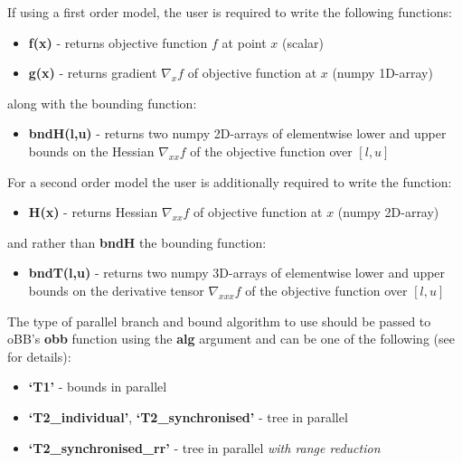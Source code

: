\documentclass[letterpaper,11pt,openany,oneside]{sphinxmanual}
\begin{document}
If using a first order model, the user is required to write the following functions:
\begin{itemize}
\item {} 
\textbf{f(x)} - returns objective function \(f\) at point \(x\) (scalar)

\item {} 
\textbf{g(x)} - returns gradient \(\nabla_x f\) of objective function at \(x\) (numpy 1D-array)

\end{itemize}

along with the bounding function:
\begin{itemize}
\item {} 
\textbf{bndH(l,u)} - returns two numpy 2D-arrays of elementwise lower and upper bounds on the Hessian \(\nabla_{xx} f\) of the objective function over \([l,u]\)

\end{itemize}

For a second order model the user is additionally required to write the function:
\begin{itemize}
\item {} 
\textbf{H(x)} - returns Hessian \(\nabla_{xx} f\) of objective function at \(x\) (numpy 2D-array)

\end{itemize}

and rather than \textbf{bndH} the bounding function:
\begin{itemize}
\item {} 
\textbf{bndT(l,u)} - returns two numpy 3D-arrays of elementwise lower and upper bounds on the derivative tensor \(\nabla_{xxx} f\) of the objective function over \([l,u]\)

\end{itemize}

The type of parallel branch and bound algorithm to use should be passed to oBB's \textbf{obb} function using the \textbf{alg} argument and can be one of the following (see \label{userguide:id5}{\hyperref[userguide:cfg2013]{\crossref{{[}CFG2013{]}}}} for details):
\begin{itemize}
\item {} 
\textbf{`T1'} - bounds in parallel

\item {} 
\textbf{`T2\_individual'}, \textbf{`T2\_synchronised'} - tree in parallel

\item {} 
\textbf{`T2\_synchronised\_rr'} - tree in parallel \emph{with range reduction}

\end{itemize}
\end{document}
